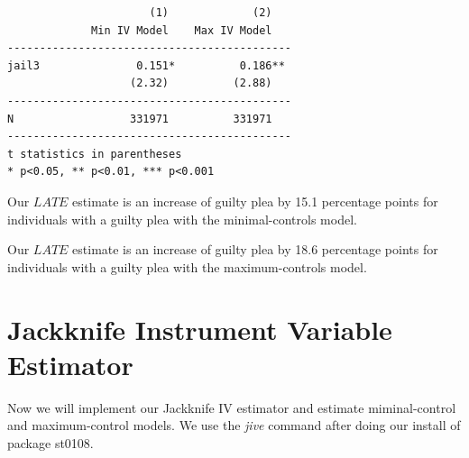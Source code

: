 \documentclass[
]{book}
\newenvironment{Shaded}{\begin{snugshade}}{\end{snugshade}}
\newcommand{\KeywordTok}[1]{\textcolor[rgb]{0.13,0.29,0.53}{\textbf{#1}}}
\newcommand{\NormalTok}[1]{#1}
\newcommand{\OtherTok}[1]{\textcolor[rgb]{0.56,0.35,0.01}{#1}}
\newcommand{\StringTok}[1]{\textcolor[rgb]{0.31,0.60,0.02}{#1}}
\begin{document}
\begin{Shaded}
\end{Shaded}

\begin{verbatim}
                      (1)             (2)   
             Min IV Model    Max IV Model   
--------------------------------------------
jail3               0.151*          0.186** 
                   (2.32)          (2.88)   
--------------------------------------------
N                  331971          331971   
--------------------------------------------
t statistics in parentheses
* p<0.05, ** p<0.01, *** p<0.001
\end{verbatim}

Our \(LATE\) estimate is an increase of guilty plea by 15.1 percentage points for individuals with a guilty plea with the minimal-controls model.

Our \(LATE\) estimate is an increase of guilty plea by 18.6 percentage points for individuals with a guilty plea with the maximum-controls model.

\section{Jackknife Instrument Variable Estimator}\label{jackknife-instrument-variable-estimator-1}

Now we will implement our Jackknife IV estimator and estimate miminal-control and maximum-control models. We use the \emph{jive} command after doing our install of package st0108.

\begin{Shaded}
\end{Shaded}
\end{document}
